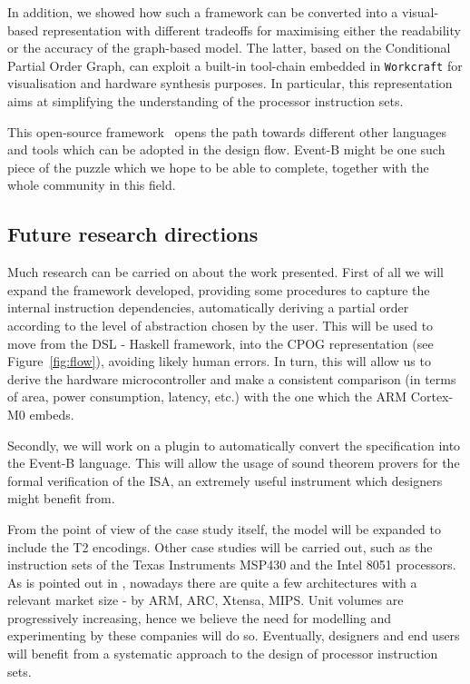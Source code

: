 \documentclass[conference]{IEEEtran}
\begin{document}
In addition, we showed how such a framework can be converted into a visual-based
representation with different tradeoffs for maximising either the readability or the accuracy
of the graph-based model. The latter, based on the Conditional Partial Order Graph, can
exploit a built-in tool-chain embedded in \verb|Workcraft| for visualisation and hardware
synthesis purposes. In particular, this representation aims at simplifying the understanding of
the processor instruction sets.

This open-source framework~\cite{repo} opens the path towards different other languages and tools which
can be adopted in the design flow. Event-B might be one such piece of the puzzle which we
hope to be able to complete, together with the whole community in this field.

\subsection{Future research directions}
\label{sec:frd}
Much research can be carried on about the work presented. First of all we will expand the
framework developed, providing some procedures to capture the internal instruction
dependencies, automatically deriving a partial order according to the level of abstraction
chosen by the user. This will be used to move from the DSL - Haskell framework, into the CPOG
representation (see Figure~\ref{fig:flow}), avoiding likely human errors. In turn, this will
allow us to derive the hardware microcontroller and make a consistent comparison (in terms of
area, power consumption, latency, etc.) with the one which the ARM Cortex-M0 embeds.

Secondly, we will work on a plugin to automatically convert the specification into the
Event-B language. This will allow the usage of sound theorem provers for the formal
verification of the ISA, an extremely useful instrument which designers might benefit from.

From the point of view of the case study itself, the model will be expanded to include the
T2 encodings. Other case studies will be carried out, such as the instruction
sets of the Texas Instruments MSP430 and the Intel 8051 processors. As is pointed out in
\cite{webArticle}, nowadays there are quite a few architectures with a relevant market size -
by ARM, ARC, Xtensa, MIPS. Unit volumes are progressively increasing, hence we believe the
need for modelling and experimenting by these companies will do so. Eventually, designers and
end users will benefit from a systematic approach to the design of processor instruction sets.
\end{document}
